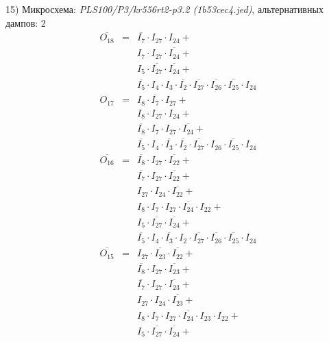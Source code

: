 \documentclass[a4paper,russian]{report}
\begin{document}
15) Микросхема: \emph{PLS100/P3/kr556rt2-p3.2  (1b53cec4.jed)}, альтернативных дампов: 2
\nopagebreak\begin{eqnarray*}
    \overline{O_{18}} & = & \overline{I_{7}} \cdotp I_{27} \cdotp I_{24} + \\
	& &  I_{7} \cdotp I_{27} \cdotp \overline{I_{24}} + \\
	& &  I_{5} \cdotp \overline{I_{27}} \cdotp \overline{I_{24}} + \\
	& &  \overline{I_{5}} \cdotp I_{4} \cdotp I_{3} \cdotp \overline{I_{2}} \cdotp \overline{I_{27}} \cdotp \overline{I_{26}} \cdotp \overline{I_{25}} \cdotp I_{24} \\
    O_{17} & = & I_{8} \cdotp \overline{I_{7}} \cdotp I_{27} + \\
	& &  I_{8} \cdotp I_{27} \cdotp I_{24} + \\
	& &  \overline{I_{8}} \cdotp I_{7} \cdotp I_{27} \cdotp \overline{I_{24}} + \\
	& &  \overline{I_{5}} \cdotp I_{4} \cdotp \overline{I_{3}} \cdotp \overline{I_{2}} \cdotp \overline{I_{27}} \cdotp I_{26} \cdotp \overline{I_{25}} \cdotp I_{24} \\
    \overline{O_{16}} & = & \overline{I_{8}} \cdotp I_{27} \cdotp \overline{I_{22}} + \\
	& &  \overline{I_{7}} \cdotp I_{27} \cdotp \overline{I_{22}} + \\
	& &  I_{27} \cdotp I_{24} \cdotp \overline{I_{22}} + \\
	& &  I_{8} \cdotp I_{7} \cdotp I_{27} \cdotp \overline{I_{24}} \cdotp I_{22} + \\
	& &  I_{5} \cdotp \overline{I_{27}} \cdotp \overline{I_{24}} + \\
	& &  \overline{I_{5}} \cdotp I_{4} \cdotp \overline{I_{3}} \cdotp I_{2} \cdotp \overline{I_{27}} \cdotp \overline{I_{26}} \cdotp \overline{I_{25}} \cdotp I_{24} \\
    \overline{O_{15}} & = & I_{27} \cdotp \overline{I_{23}} \cdotp \overline{I_{22}} + \\
	& &  \overline{I_{8}} \cdotp I_{27} \cdotp \overline{I_{23}} + \\
	& &  \overline{I_{7}} \cdotp I_{27} \cdotp \overline{I_{23}} + \\
	& &  I_{27} \cdotp I_{24} \cdotp \overline{I_{23}} + \\
	& &  I_{8} \cdotp I_{7} \cdotp I_{27} \cdotp \overline{I_{24}} \cdotp I_{23} \cdotp I_{22} + \\
	& &  I_{5} \cdotp \overline{I_{27}} \cdotp \overline{I_{24}} + \\

\end{eqnarray*}
\end{document}
